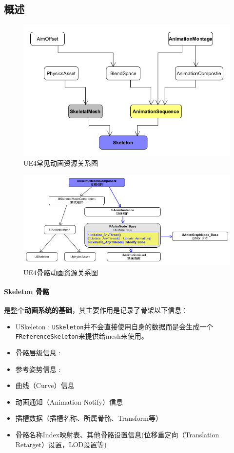\documentclass[UTF8,a4paper,12pt]{ctexbook}
\begin{document}
		\subsection{概述}
			\begin{figure}[H]
				\centering
				\includegraphics[width=.9\linewidth]{Anim_datas}
				\caption{UE4常见动画资源关系图}
			\end{figure}


			\begin{figure}[H]
				\centering
				\includegraphics[width=.9\linewidth]{Anim_datas01}
				\caption{UE4骨骼动画资源关系图}
			\end{figure}		
		
			\paragraph{Skeleton 骨骼}
				是整个\textbf{动画系统的基础}，其主要作用是记录了骨架以下信息：
				
				\begin{itemize}
					\item USkeleton : \verb|USkeleton|并不会直接使用自身的数据而是会生成一个\verb|FReferenceSkeleton|来提供给mesh来使用。
					\item 骨骼层级信息 :
					\item 参考姿势信息 :
					\item 曲线（Curve）信息
					\item 动画通知（Animation Notify）信息
					\item 插槽数据（插槽名称、所属骨骼、Transform等）
					\item 骨骼名称Index映射表、其他骨骼设置信息(位移重定向（Translation Retarget）设置，LOD设置等)
				\end{itemize}
			
\end{document}
